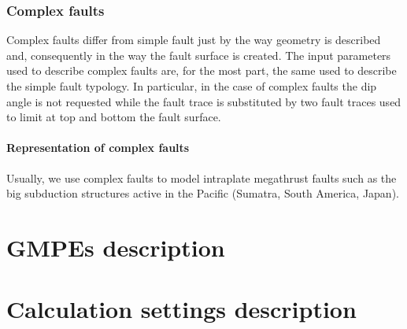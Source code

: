 \subsubsection{Complex faults}
%
Complex faults differ from simple fault just by the way geometry is described and, 
consequently in the way the fault surface is created. The input parameters used to 
describe complex faults are, for the most part, the same used to describe the 
simple fault typology. In particular, in the case of complex faults the dip angle
is not requested while the fault trace is substituted by two fault traces used to 
limit at top and bottom the fault surface. 
%
\paragraph{Representation of complex faults}
%
Usually, we use complex faults to model intraplate megathrust faults such as the 
big subduction structures active in the Pacific (Sumatra, South America, Japan).

%
\section{GMPEs description}
\label{hazard:gmpe_selection}
%

%
\section{Calculation settings description}
\label{hazard:calculation_settings}
%



